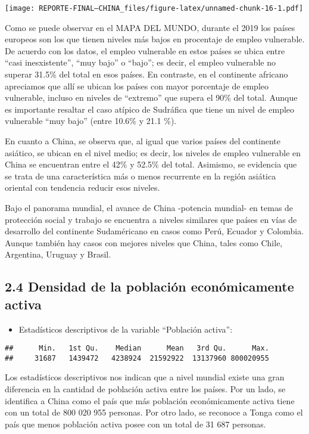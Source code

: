 \documentclass[
]{article}
\providecommand{\tightlist}{%
  \setlength{\itemsep}{0pt}\setlength{\parskip}{0pt}}
\begin{document}
\texttt{[image: REPORTE-FINAL--CHINA\_files/figure-latex/unnamed-chunk-16-1.pdf]}

Como se puede observar en el MAPA DEL MUNDO, durante el 2019 los países
europeos son los que tienen niveles más bajos en procentaje de empleo
vulnerable. De acuerdo con los datos, el empleo vulnerable en estos
países se ubica entre ``casi inesxistente'', ``muy bajo'' o ``bajo''; es
decir, el empleo vulnerable no superar 31.5\% del total en esos países.
En contraste, en el continente africano apreciamos que allí se ubican
los países con mayor porcentaje de empleo vulnerable, incluso en niveles
de ``extremo'' que supera el 90\% del total. Aunque es importante
resaltar el caso atípico de Sudráfica que tiene un nivel de empleo
vulnerable ``muy bajo'' (entre 10.6\% y 21.1 \%).

En cuanto a China, se observa que, al igual que varios países del
continente asiático, se ubican en el nivel medio; es decir, los niveles
de empleo vulnerable en China se encuentran entre el 42\% y 52.5\% del
total. Asimismo, se evidencia que se trata de una característica más o
menos recurrente en la región asiática oriental con tendencia reducir
esos niveles.

Bajo el panorama mundial, el avance de China -potencia mundial- en temas
de protección social y trabajo se encuentra a niveles similares que
países en vías de desarrollo del continente Sudaméricano en casos como
Perú, Ecuador y Colombia. Aunque también hay casos con mejores niveles
que China, tales como Chile, Argentina, Uruguay y Brasil.

\hypertarget{densidad-de-la-poblaciuxf3n-econuxf3micamente-activa}{%
\subsection{2.4 Densidad de la población económicamente
activa}\label{densidad-de-la-poblaciuxf3n-econuxf3micamente-activa}}

\begin{itemize}
\tightlist
\item
  Estadísticos descriptivos de la variable ``Población activa'':
\end{itemize}

\begin{verbatim}
##      Min.   1st Qu.    Median      Mean   3rd Qu.      Max. 
##     31687   1439472   4238924  21592922  13137960 800020955
\end{verbatim}

Los estadísticos descriptivos nos indican que a nivel mundial existe una
gran diferencia en la cantidad de población activa entre los países. Por
un lado, se identifica a China como el país que más población
económicamente activa tiene con un total de 800 020 955 personas. Por
otro lado, se reconoce a Tonga como el país que menos población activa
posee con un total de 31 687 personas.
\end{document}
